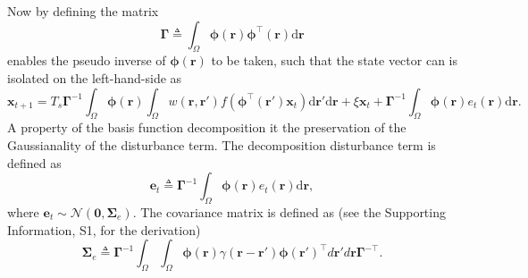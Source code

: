\documentclass[]{article}
\begin{document}
Now by defining the matrix
\begin{equation}\label{eq:DefGamma}
	\boldsymbol{\Gamma} \triangleq \int_\Omega {\boldsymbol{\phi} \left(\mathbf{r}\right)\boldsymbol{\phi} ^{\top}\left(\mathbf{r}\right)\textrm{d}\mathbf{r}} 
\end{equation}
enables the pseudo inverse of $\boldsymbol{\phi(\mathbf{r})}$ to be taken, such that the state vector can is isolated on the left-hand-side as
\begin{equation}\label{eq:ReducedForm}
	 \mathbf{x}_{t+1} = T_s\boldsymbol{\Gamma}^{-1}
	 \int_\Omega \boldsymbol{\phi}(\mathbf{r}) 
	 \int_\Omega w(\mathbf{r},\mathbf{r}')f(\boldsymbol{\phi}^{\top}(\mathbf{r}')\mathbf{x}_t) \textrm{d}\mathbf{r}' \textrm{d}\mathbf{r} 
	 + \xi\mathbf{x}_t + \boldsymbol{\Gamma}^{-1} \int_\Omega{\boldsymbol{\phi}(\mathbf{r}) e_t(\mathbf{r})\textrm{d}\mathbf{r}}.
\end{equation}
A property of the basis function decomposition it the preservation of the Gaussianality of the disturbance term. The decomposition disturbance term is defined as
\begin{equation}\label{eq:Wt} 
	\mathbf{e}_t \triangleq \boldsymbol{\Gamma}^{-1}\int_\Omega {\boldsymbol{\phi} ( \mathbf{r} )e_t( \mathbf{r} )\textrm{d}\mathbf{r}},
\end{equation}
where $\mathbf{e}_t \sim\mathcal{N}(\mathbf 0,\boldsymbol\Sigma_e)$. The covariance matrix is defined as (see the Supporting Information, S1, for the derivation)
\begin{equation}
	\boldsymbol\Sigma_e \triangleq \mathbf{\Gamma}^{-1}\int_{\Omega}\int_{\Omega}\boldsymbol{\phi}\left(\mathbf r\right) \gamma\left(\mathbf r- \mathbf r' \right)\boldsymbol{\phi}\left(\mathbf r'\right)^{\top}d\mathbf r' d\mathbf r\mathbf{\Gamma}^{- \top}. 
\end{equation}
\end{document}
